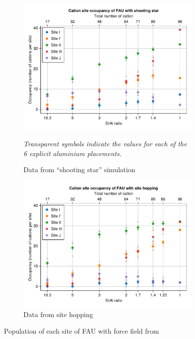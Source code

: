 \documentclass[main.tex]{subfiles}
\begin{document}
\begin{figure}
	\centering
	\begin{subfigure}{0.9\linewidth}
		{\centering
		\includegraphics[width=\linewidth]{figures/cations/directsite_FAU.pdf}
		\caption{Data from ``shooting star'' simulation}\label{fig:directsiteFAU}

		\sl Transparent symbols indicate the values for each of the 6 explicit aluminium placements.}
	\end{subfigure}

	\begin{subfigure}{0.9\linewidth}
		\centering
		\includegraphics[width=\linewidth]{figures/cations/sitehopping_FAU.pdf}
		\caption{Data from site hopping}
	\end{subfigure}

	\caption{Population of each site of FAU with force field from \textcite{BoulfelfelSholl2021}}
\end{figure}
\end{document}
